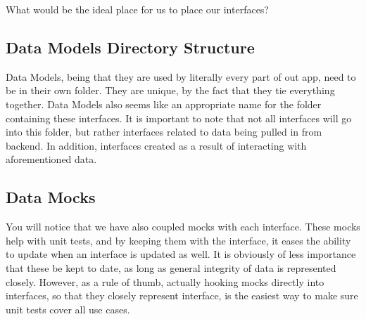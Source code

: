 What would be the ideal place for us to place our interfaces?

\subsection{Data Models Directory Structure}
Data Models, being that they are used by literally every part of out app, need
to be in their own folder. They are unique, by the fact that they tie everything
together. Data Models also seems like an appropriate name for the folder
containing these interfaces. It is important to note that not all interfaces
will go into this folder, but rather interfaces related to data being pulled in
from backend. In addition, interfaces created as a result of interacting with
aforementioned data.



\subsection{Data Mocks}
You will notice that we have also coupled mocks with each interface. These mocks
help with unit tests, and by keeping them with the interface, it eases the
ability to update when an interface is updated as well. It is obviously of less
importance that these be kept to date, as long as general integrity of data
is represented closely. However, as a rule of thumb, actually hooking mocks
directly into interfaces, so that they closely represent interface, is the
easiest way to make sure unit tests cover all use cases.
